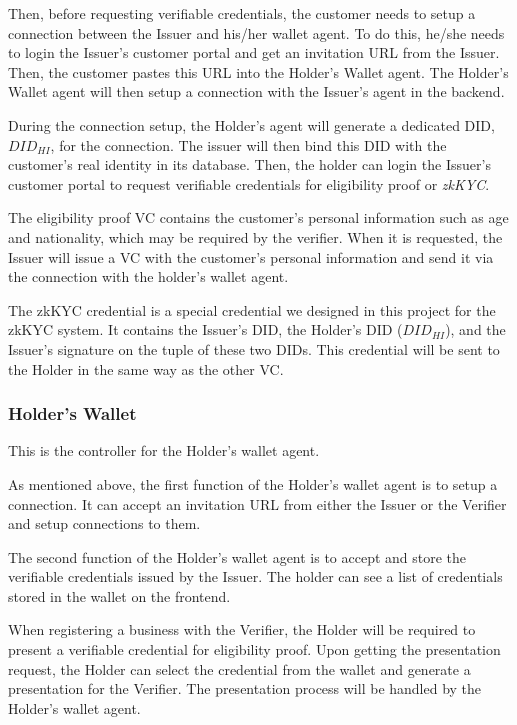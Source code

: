 \documentclass[
]{report}
\begin{document}
Then, before requesting verifiable credentials, the customer needs to setup a 
connection between the Issuer and his/her wallet agent. To do this, he/she
needs to login the Issuer's customer portal and get an invitation URL from
the Issuer. Then, the customer pastes this URL into the Holder's Wallet agent.
The Holder's Wallet agent will then setup a connection with the Issuer's
agent in the backend.

During the connection setup, the Holder's agent will generate a dedicated DID,
\texttt{$DID_{HI}$}, for the connection. The issuer will then bind this DID
with the customer's real identity in its database.
Then, the holder can login the Issuer's customer portal to request verifiable
credentials for eligibility proof or \emph{zkKYC}.

The eligibility proof VC contains the customer's personal information such as
age and nationality, which may be required by the verifier. When it is
requested, the Issuer will issue a VC with the customer's personal information
and send it via the connection with the holder's wallet agent.

The zkKYC credential is a special credential we designed in this project for
the zkKYC system. It contains the Issuer's DID, the Holder's DID 
(\texttt{$DID_{HI}$}), and the Issuer's signature on the tuple of these two
DIDs. This credential will be sent to the Holder in the same way as the other
VC.

\subsubsection{Holder's Wallet}
This is the controller for the Holder's wallet agent.

As mentioned above, the first function of the Holder's wallet agent is to
setup a connection. It can accept an invitation URL from either the Issuer
or the Verifier and setup connections to them.

The second function of the Holder's wallet agent is to accept and store the
verifiable credentials issued by the Issuer. The holder can see a list of
credentials stored in the wallet on the frontend.

When registering a business with the Verifier, the Holder will be required
to present a verifiable credential for eligibility proof. Upon getting the
presentation request, the Holder can select the credential from the wallet
and generate a presentation for the Verifier. The presentation process will
be handled by the Holder's wallet agent.
\end{document}

